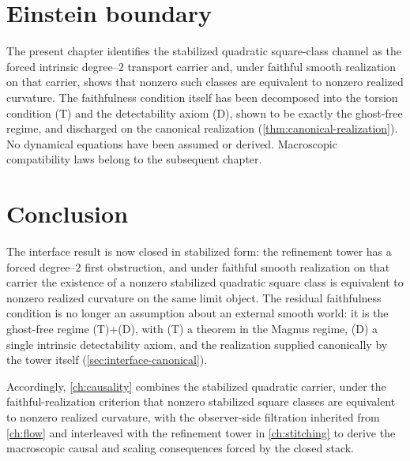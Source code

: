 \section{Einstein boundary}
\label{sec:interface-boundary}
The present chapter identifies the stabilized quadratic square-class
channel as the forced intrinsic degree--\(2\) transport carrier and,
under faithful smooth realization on that carrier, shows that nonzero
such classes are equivalent to nonzero realized curvature.
The faithfulness condition itself has been decomposed into the torsion
condition \textup{(T)} and the detectability axiom \textup{(D)}, shown
to be exactly the ghost-free regime, and discharged on the canonical
realization (\cref{thm:canonical-realization}).
No dynamical equations have been assumed or derived.
Macroscopic compatibility laws belong to the subsequent chapter.

\section{Conclusion}
\label{sec:interface-conclusion}
The interface result is now closed in stabilized form: the refinement
tower has a forced degree--\(2\) first obstruction, and under faithful
smooth realization on that carrier the existence of a nonzero stabilized
quadratic square class is equivalent to nonzero realized curvature on the
same limit object.  The residual faithfulness condition is no longer an
assumption about an external smooth world: it is the ghost-free regime
\textup{(T)}+\textup{(D)}, with \textup{(T)} a theorem in the Magnus
regime, \textup{(D)} a single intrinsic detectability axiom, and the
realization supplied canonically by the tower itself
(\cref{sec:interface-canonical}).

Accordingly, \cref{ch:causality} combines the stabilized quadratic
carrier, under the faithful-realization criterion that nonzero stabilized
square classes are equivalent to nonzero realized curvature, with the
observer-side filtration inherited from
\cref{ch:flow} and interleaved with the refinement tower in
\cref{ch:stitching} to derive the macroscopic causal and scaling
consequences forced by the closed stack.

\begin{chapterclosing}
\end{chapterclosing}
